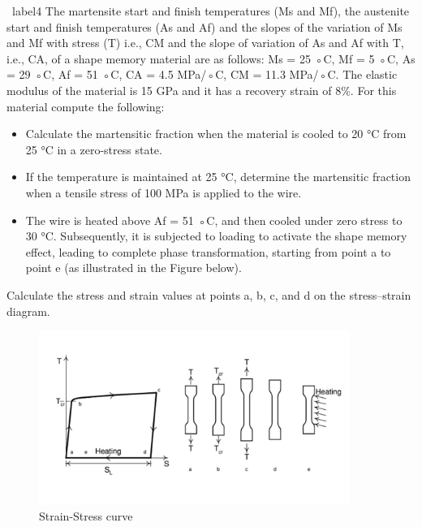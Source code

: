 \documentclass[a4paper]{tufte-handout} %
\begin{document}
\begin{prob}{~}{label4}
The martensite start and finish temperatures (Ms and Mf), the austenite start and finish temperatures (As and Af) and the slopes of the variation of Ms and Mf with stress (T) i.e., CM and the slope of variation of As and Af with T, i.e., CA, of a shape memory material are as follows: Ms = 25 ◦C, Mf = 5 ◦C, As = 29 ◦C, Af = 51 ◦C, CA = 4.5 MPa/◦C, CM = 11.3 MPa/◦C. 
The elastic modulus of the material is 15 GPa and it has a recovery strain of 8\%. 
For this material compute the following: 
\begin{itemize}
    \item Calculate the martensitic fraction when the material is cooled to 20 °C from 25 °C in a zero-stress state.
    \item If the temperature is maintained at 25 °C, determine the martensitic fraction when a tensile stress of 100 MPa is applied to the wire.
    \item The wire is heated above Af = 51 ◦C, and then cooled under zero stress to 30 °C. Subsequently, it is subjected to loading to activate the shape memory effect, leading to complete phase transformation, starting from point a to point e (as illustrated in the Figure below).
\end{itemize}
Calculate the stress and strain values at points a, b, c, and d on the stress–strain diagram.
\end{prob}

\begin{figure}[ht!]
    \includegraphics[width=0.9\textwidth]{imgs/SMAcurve.jpg}
    \caption{Strain-Stress curve}\label{fig:hmk2}
\end{figure}
\end{document}
